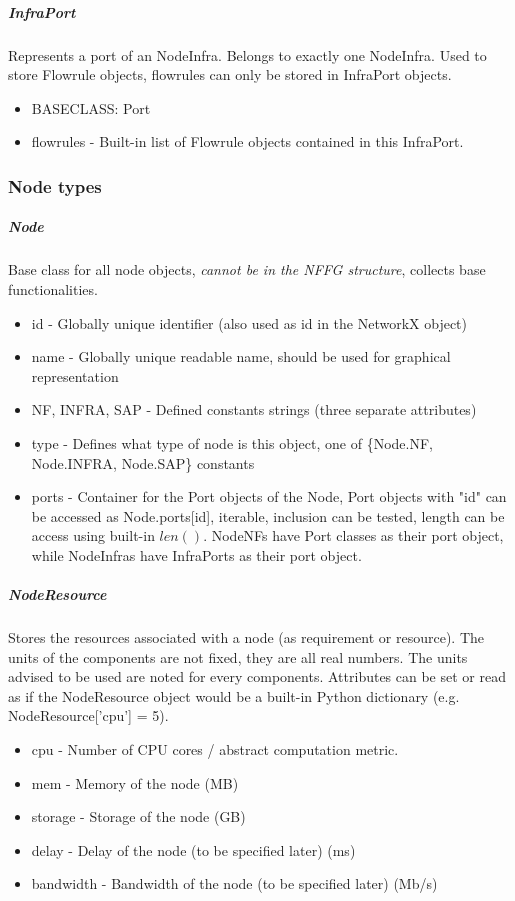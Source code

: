 \documentclass[a4paper,10pt]{scrartcl}
\begin{document}
\subparagraph{InfraPort}
Represents a port of an NodeInfra. Belongs to exactly one NodeInfra. 
Used to store Flowrule objects, flowrules can only be stored in InfraPort objects.
\begin{itemize}
\item BASECLASS: Port
\item flowrules - Built-in list of Flowrule objects contained in this InfraPort.
\end{itemize}

\subsubsection{Node types}

\subparagraph{Node}
Base class for all node objects, \emph{cannot be in the NFFG structure}, collects base functionalities.
\begin{itemize}
\item id - Globally unique identifier (also used as id in the NetworkX object)
\item name - Globally unique readable name, should be used for graphical representation
\item NF, INFRA, SAP - Defined constants strings (three separate attributes)
\item type - Defines what type of node is this object, one of \{Node.NF, Node.INFRA, Node.SAP\} constants
\item ports - Container for the Port objects of the Node, 
Port objects with "id" can be accessed as Node.ports[id], iterable, 
inclusion can be tested, length can be access using built-in $len()$. 
NodeNFs have Port classes as their port object, while NodeInfras have InfraPorts as their port object.
\end{itemize}

\subparagraph{NodeResource}
Stores the resources associated with a node (as requirement or resource). 
The units of the components are not fixed, they are all real numbers. 
The units advised to be used are noted for every components.
Attributes can be set or read as if the NodeResource object would be a built-in Python dictionary 
(e.g. NodeResource['cpu'] = 5).
\begin{itemize}
\item cpu - Number of CPU cores / abstract computation metric.
\item mem - Memory of the node (MB)
\item storage - Storage of the node (GB)
\item delay - Delay of the node  (to be specified later) (ms)
\item bandwidth - Bandwidth of the node (to be specified later) (Mb/s)
\end{itemize}
\end{document}
